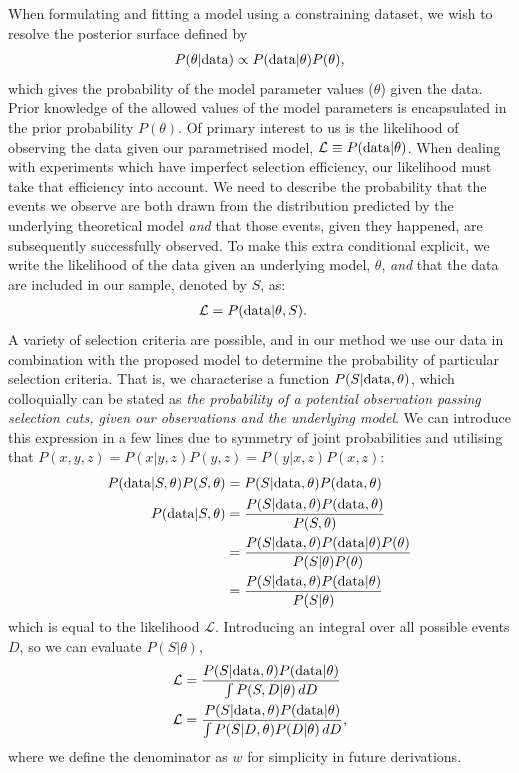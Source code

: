 \documentclass[a4paper,fleqn,usenatbib]{mnras}
\begin{document}
When formulating and fitting a model using a constraining dataset, we wish to resolve the posterior surface defined by
\begin{align}
P(\theta | {\rm data}) \propto P({\rm data} | \theta) P(\theta),
\end{align}
which gives the probability of the model parameter values ($\theta$) given the data.  Prior knowledge of the allowed values of the model parameters is encapsulated in the prior probability $P(\theta)$. Of primary interest to us is the likelihood of observing the data given our parametrised model, $\mathcal{L} \equiv P({\rm data} | \theta)$. When dealing with experiments which have imperfect selection efficiency, our likelihood must take that efficiency into account.  We need to describe the probability that the events we observe are both drawn from the distribution predicted by the underlying theoretical model \textit{and} that those events, given they happened, are subsequently successfully observed.  To make this extra conditional explicit, we write the likelihood of the data given an underlying model, $\theta$, \textit{and} that the data are included in our sample, denoted by $S$, as:
\begin{align}
\mathcal{L} &= P({\rm data} | \theta, S). \label{eq:app_like}
\end{align}
A variety of selection criteria are possible, and in our method we use our data in combination with the proposed model to determine the probability of particular selection criteria.  That is, we characterise a function $P(S|{\rm data},\theta)$, which colloquially can be stated as \textit{the probability of a potential observation passing selection cuts, given our observations and the underlying model}. We can introduce this expression in a few lines due to symmetry of joint probabilities and utilising that $P(x,y,z) = P(x|y,z)P(y,z) = P(y|x, z)P(x, z)$:
\begin{align}
P({\rm data} | S , \theta) P(S, \theta) &= P(S | {\rm data}, \theta) P({\rm data}, \theta)\\
P({\rm data} | S , \theta) &= \frac{ P(S | {\rm data}, \theta) P({\rm data}, \theta) }{ P(S, \theta) }\\
&= \frac{ P(S | {\rm data}, \theta) P({\rm data} | \theta) P(\theta)}{ P(S | \theta)  P(\theta)}\\
&= \frac{ P(S | {\rm data}, \theta) P({\rm data} | \theta)}{ P(S | \theta) }
\end{align}
which is equal to the likelihood $\mathcal{L}$. Introducing an integral over all possible events $D$, so we can evaluate $P(S|\theta)$, 
\begin{align}
\mathcal{L}&= \frac{P(S|{\rm data},\theta) P({\rm data}|\theta)}{\int P(S, D|\theta)\, dD} \\
\mathcal{L} &= \frac{P(S|{\rm data},\theta) P({\rm data}|\theta)}{\int P(S | D, \theta) P(D|\theta)\, dD}, \label{eq:app_main}
\end{align}
where we define the denominator as $w$ for simplicity in future derivations.
\end{document}
